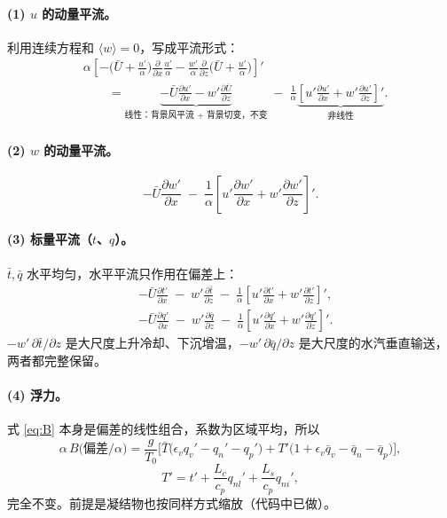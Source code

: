 \documentclass[11pt,a4paper]{article}
\newcommand{\avg}[1]{\langle #1\rangle}
\newcommand{\pd}[2]{\frac{\partial #1}{\partial #2}}
\newcommand{\aI}{\frac{1}{\alpha}}
\begin{document}
\paragraph{(1) $u$ 的动量平流。}
利用连续方程和 $\avg{w}=0$，写成平流形式：
\begin{align}
&\alpha\left[-\Big(\bar U+\frac{u'}{\alpha}\Big)\pd{}{x}\frac{u'}{\alpha} - \frac{w'}{\alpha}\pd{}{z}\Big(\bar U+\frac{u'}{\alpha}\Big)\right]' \nonumber\\
&\qquad= \underbrace{-\bar U\pd{u'}{x} - w'\pd{\bar U}{z}}_{\text{线性：背景风平流 + 背景切变，不变}}
\;-\;\aI\underbrace{\left[u'\pd{u'}{x}+w'\pd{u'}{z}\right]'}_{\text{非线性}} .
\end{align}

\paragraph{(2) $w$ 的动量平流。}
\begin{equation}
-\bar U\pd{w'}{x} \;-\; \aI\left[u'\pd{w'}{x}+w'\pd{w'}{z}\right]' .
\end{equation}

\paragraph{(3) 标量平流（$t$、$q$）。}
$\bar t,\bar q$ 水平均匀，水平平流只作用在偏差上：
\begin{align}
&-\bar U\pd{t'}{x} \;-\; w'\pd{\bar t}{z} \;-\; \aI\left[u'\pd{t'}{x}+w'\pd{t'}{z}\right]' ,\\
&-\bar U\pd{q'}{x} \;-\; w'\pd{\bar q}{z} \;-\; \aI\left[u'\pd{q'}{x}+w'\pd{q'}{z}\right]' .
\end{align}
$-w'\,\partial\bar t/\partial z$ 是大尺度上升冷却、下沉增温，$-w'\,\partial\bar q/\partial z$ 是大尺度的水汽垂直输送，两者都完整保留。

\paragraph{(4) 浮力。}
式 \eqref{eq:B} 本身是偏差的线性组合，系数为区域平均，所以
\begin{equation}
\alpha\, B\big(\text{偏差}/\alpha\big) = \frac{g}{T_0}\Big[\bar T\big(\epsilon_v q_v' - q_n' - q_p'\big) + T'\big(1+\epsilon_v\bar q_v-\bar q_n-\bar q_p\big)\Big],
\end{equation}
\begin{equation}
T' = t' + \frac{L_c}{c_p}q_{nl}' + \frac{L_s}{c_p}q_{ni}' ,
\end{equation}
完全不变。前提是凝结物也按同样方式缩放（代码中已做）。
\end{document}

